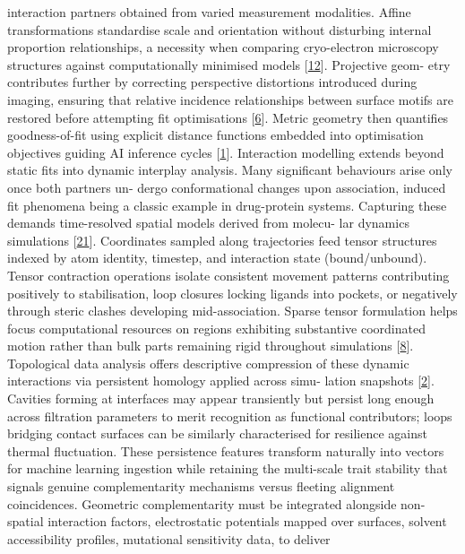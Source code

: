 \documentclass[
]{article}
\begin{document}
interaction partners obtained from varied measurement modalities. Affine
transformations standardise scale and orientation without disturbing
internal proportion relationships, a necessity when comparing
cryo-electron microscopy structures against computationally minimised
models {[}\protect\hyperlink{_bookmark52}{12}{]}. Projective geom- etry
contributes further by correcting perspective distortions introduced
during imaging, ensuring that relative incidence relationships between
surface motifs are restored before attempting fit optimisations
{[}\protect\hyperlink{_bookmark46}{6}{]}. Metric geometry then
quantifies goodness-of-fit using explicit distance functions embedded
into optimisation objectives guiding AI inference cycles
{[}\protect\hyperlink{_bookmark41}{1}{]}. Interaction modelling extends
beyond static fits into dynamic interplay analysis. Many significant
behaviours arise only once both partners un- dergo conformational
changes upon association, induced fit phenomena being a classic example
in drug-protein systems. Capturing these demands time-resolved spatial
models derived from molecu- lar dynamics simulations
{[}\protect\hyperlink{_bookmark61}{21}{]}. Coordinates sampled along
trajectories feed tensor structures indexed by atom identity, timestep,
and interaction state (bound/unbound). Tensor contraction operations
isolate consistent movement patterns contributing positively to
stabilisation, loop closures locking ligands into pockets, or negatively
through steric clashes developing mid-association. Sparse tensor
formulation helps focus computational resources on regions exhibiting
substantive coordinated motion rather than bulk parts remaining rigid
throughout simulations {[}\protect\hyperlink{_bookmark48}{8}{]}.
Topological data analysis offers descriptive compression of these
dynamic interactions via persistent homology applied across simu- lation
snapshots {[}\protect\hyperlink{_bookmark42}{2}{]}. Cavities forming at
interfaces may appear transiently but persist long enough across
filtration parameters to merit recognition as functional contributors;
loops bridging contact surfaces can be similarly characterised for
resilience against thermal fluctuation. These persistence features
transform naturally into vectors for machine learning ingestion while
retaining the multi-scale trait stability that signals genuine
complementarity mechanisms versus fleeting alignment coincidences.
Geometric complementarity must be integrated alongside non-spatial
interaction factors, electrostatic potentials mapped over surfaces,
solvent accessibility profiles, mutational sensitivity data, to deliver
\end{document}
